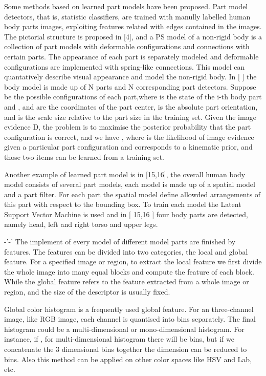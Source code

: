 Some methods based on learned part models have been proposed. Part model detectors, that is, statistic classifiers, are trained with manully labelled human body parts images, exploiting features related with edges contained in the images. The pictorial structure is proposed in [4], and a PS model of a non-rigid body is a collection of part models with deformable configurations and connections with certain parts. The appearance of each part is separately modeled and deformable configurations are implemented with spring-like connections. This model can quantatively describe visual appearance and model the non-rigid body. In [ ] the body model is made up of N parts and N corresponding part detectors. Suppose  be the possible configurations of each part,where  is the state of the i-th body part and , and  are the coordinates of the part center,  is the absolute part orientation, and  is the scale size relative to the part size in the training set.  Given the image evidence D, the problem is to maximise the posterior  probability  that the part configuration is correct, and we have , where  is the likelihood of image evidence given a particular part configuration and  corresponds to a kinematic prior, and those two items can be learned from a training set.

Another example of learned part model is in [15,16], the overall human body model consists of several part models, each model is made up of a spatial model and a part filter. For each part the spatial model define allowded arrangements of this part with respect to the bounding box. To train each model the Latent Support Vector Machine is used and in [ 15,16 ] four body parts are detected, namely head, left and right torso and upper legs.

-'-'
The implement of every model of different model parts are finished by features. The features can be divided into two categories, the local and global feature. For a specified image or region, to extract the local feature we first divide the whole image into many equal blocks and compute the feature of each block. While the global feature refers to the feature extracted from a whole image or region, and the size of the descriptor is usually fixed. 

Global color histogram is a frequently used global feature. For an three-channel image, like RGB image, each channel is quantised into  bins separately. The final histogram could be a multi-dimensional or mono-dimensional histogram. For instance, if , for multi-dimensional histogram there will be  bins, but if we concatenate the 3 dimensional bins together the dimension can be reduced to  bins. Also this method can be applied on other color spaces like HSV and Lab, etc.

